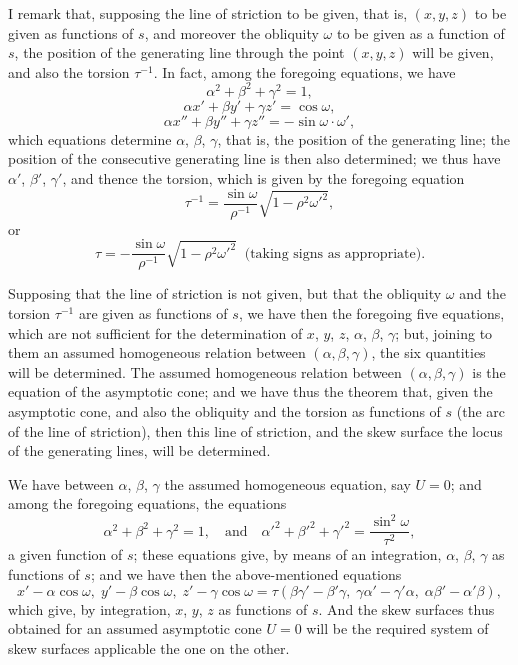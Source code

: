 \documentclass[11pt,a4paper]{article}
\begin{document}
I remark that, supposing the line of striction to be given, that is, $(x, y, z)$ to be given as functions of $s$, and moreover the obliquity $\omega$ to be given as a function of $s$, the position of the generating line through the point $(x, y, z)$ will be given, and also the torsion $\tau^{-1}$. In fact, among the foregoing equations, we have
\[
\alpha^2 + \beta^2 + \gamma^2 = 1,
\]
\[
\alpha x' + \beta y' + \gamma z' = \cos\omega,
\]
\[
\alpha x'' + \beta y'' + \gamma z'' = -\sin\omega\cdot\omega',
\]
which equations determine $\alpha$, $\beta$, $\gamma$, that is, the position of the generating line; the position of the consecutive generating line is then also determined; we thus have $\alpha'$, $\beta'$, $\gamma'$, and thence the torsion, which is given by the foregoing equation
\[
\tau^{-1} = \frac{\sin\omega}{\rho^{-1}}\sqrt{1 - \rho^2 \omega'^2},
\]
or
\[
\tau = -\frac{\sin\omega}{\rho^{-1}}\sqrt{1 - \rho^2 \omega'^2}\;\;\text{(taking signs as appropriate)}.
\]

Supposing that the line of striction is not given, but that the obliquity $\omega$ and the torsion $\tau^{-1}$ are given as functions of $s$, we have then the foregoing five equations, which are not sufficient for the determination of $x$, $y$, $z$, $\alpha$, $\beta$, $\gamma$; but, joining to them an assumed homogeneous relation between $(\alpha, \beta, \gamma)$, the six quantities will be determined. The assumed homogeneous relation between $(\alpha, \beta, \gamma)$ is the equation of the asymptotic cone; and we have thus the theorem that, given the asymptotic cone, and also the obliquity and the torsion as functions of $s$ (the arc of the line of striction), then this line of striction, and the skew surface the locus of the generating lines, will be determined.

We have between $\alpha$, $\beta$, $\gamma$ the assumed homogeneous equation, say $U = 0$; and among the foregoing equations, the equations
\[
\alpha^2 + \beta^2 + \gamma^2 = 1,\quad \text{and}\quad \alpha'^2 + \beta'^2 + \gamma'^2 = \frac{\sin^2\omega}{\tau^2},
\]
a given function of $s$; these equations give, by means of an integration, $\alpha$, $\beta$, $\gamma$ as functions of $s$; and we have then the above-mentioned equations
\[
x' - \alpha\cos\omega,\; y' - \beta\cos\omega,\; z' - \gamma\cos\omega = \tau(\beta\gamma' - \beta'\gamma,\; \gamma\alpha' - \gamma'\alpha,\; \alpha\beta' - \alpha'\beta),
\]
which give, by integration, $x$, $y$, $z$ as functions of $s$. And the skew surfaces thus obtained for an assumed asymptotic cone $U = 0$ will be the required system of skew surfaces applicable the one on the other.
\end{document}
